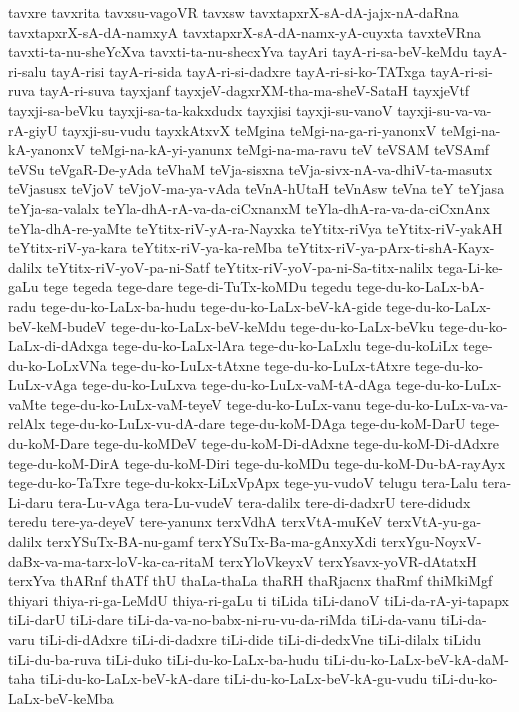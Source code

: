 {tavxre
tavxrita
tavxsu-vagoVR
tavxsw
tavxtapxrX-sA-dA-jajx-nA-daRna
tavxtapxrX-sA-dA-namxyA
tavxtapxrX-sA-dA-namx-yA-cuyxta
tavxteVRna
tavxti-ta-nu-sheYcXva
tavxti-ta-nu-shecxYva
tayAri
tayA-ri-sa-beV-keMdu
tayA-ri-salu
tayA-risi
tayA-ri-sida
tayA-ri-si-dadxre
tayA-ri-si-ko-TATxga
tayA-ri-si-ruva
tayA-ri-suva
tayxjanf
tayxjeV-dagxrXM-tha-ma-sheV-SataH
tayxjeVtf
tayxji-sa-beVku
tayxji-sa-ta-kakxdudx
tayxjisi
tayxji-su-vanoV
tayxji-su-va-va-rA-giyU
tayxji-su-vudu
tayxkAtxvX
teMgina
teMgi-na-ga-ri-yanonxV
teMgi-na-kA-yanonxV
teMgi-na-kA-yi-yanunx
teMgi-na-ma-ravu
teV
teVSAM
teVSAmf
teVSu
teVgaR-De-yAda
teVhaM
teVja-sisxna
teVja-sivx-nA-va-dhiV-ta-masutx
teVjasusx
teVjoV
teVjoV-ma-ya-vAda
teVnA-hUtaH
teVnAsw
teVna
teY
teYjasa
teYja-sa-valalx
teYla-dhA-rA-va-da-ciCxnanxM
teYla-dhA-ra-va-da-ciCxnAnx
teYla-dhA-re-yaMte
teYtitx-riV-yA-ra-Nayxka
teYtitx-riVya
teYtitx-riV-yakAH
teYtitx-riV-ya-kara
teYtitx-riV-ya-ka-reMba
teYtitx-riV-ya-pArx-ti-shA-Kayx-dalilx
teYtitx-riV-yoV-pa-ni-Satf
teYtitx-riV-yoV-pa-ni-Sa-titx-nalilx
tega-Li-ke-gaLu
tege
tegeda
tege-dare
tege-di-TuTx-koMDu
tegedu
tege-du-ko-LaLx-bA-radu
tege-du-ko-LaLx-ba-hudu
tege-du-ko-LaLx-beV-kA-gide
tege-du-ko-LaLx-beV-keM-budeV
tege-du-ko-LaLx-beV-keMdu
tege-du-ko-LaLx-beVku
tege-du-ko-LaLx-di-dAdxga
tege-du-ko-LaLx-lAra
tege-du-ko-LaLxlu
tege-du-koLiLx
tege-du-ko-LoLxVNa
tege-du-ko-LuLx-tAtxne
tege-du-ko-LuLx-tAtxre
tege-du-ko-LuLx-vAga
tege-du-ko-LuLxva
tege-du-ko-LuLx-vaM-tA-dAga
tege-du-ko-LuLx-vaMte
tege-du-ko-LuLx-vaM-teyeV
tege-du-ko-LuLx-vanu
tege-du-ko-LuLx-va-va-relAlx
tege-du-ko-LuLx-vu-dA-dare
tege-du-koM-DAga
tege-du-koM-DarU
tege-du-koM-Dare
tege-du-koMDeV
tege-du-koM-Di-dAdxne
tege-du-koM-Di-dAdxre
tege-du-koM-DirA
tege-du-koM-Diri
tege-du-koMDu
tege-du-koM-Du-bA-rayAyx
tege-du-ko-TaTxre
tege-du-kokx-LiLxVpApx
tege-yu-vudoV
telugu
tera-Lalu
tera-Li-daru
tera-Lu-vAga
tera-Lu-vudeV
tera-dalilx
tere-di-dadxrU
tere-didudx
teredu
tere-ya-deyeV
tere-yanunx
terxVdhA
terxVtA-muKeV
terxVtA-yu-ga-dalilx
terxYSuTx-BA-nu-gamf
terxYSuTx-Ba-ma-gAnxyXdi
terxYgu-NoyxV-daBx-va-ma-tarx-loV-ka-ca-ritaM
terxYloVkeyxV
terxYsavx-yoVR-dAtatxH
terxYva
thARnf
thATf
thU
thaLa-thaLa
thaRH
thaRjacnx
thaRmf
thiMkiMgf
thiyari
thiya-ri-ga-LeMdU
thiya-ri-gaLu
ti
tiLida
tiLi-danoV
tiLi-da-rA-yi-tapapx
tiLi-darU
tiLi-dare
tiLi-da-va-no-babx-ni-ru-vu-da-riMda
tiLi-da-vanu
tiLi-da-varu
tiLi-di-dAdxre
tiLi-di-dadxre
tiLi-dide
tiLi-di-dedxVne
tiLi-dilalx
tiLidu
tiLi-du-ba-ruva
tiLi-duko
tiLi-du-ko-LaLx-ba-hudu
tiLi-du-ko-LaLx-beV-kA-daM-taha
tiLi-du-ko-LaLx-beV-kA-dare
tiLi-du-ko-LaLx-beV-kA-gu-vudu
tiLi-du-ko-LaLx-beV-keMba
}
